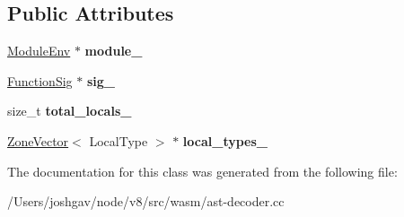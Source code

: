 \subsection*{Public Attributes}
\begin{DoxyCompactItemize}
\item 
\hyperlink{structv8_1_1internal_1_1wasm_1_1_module_env}{Module\+Env} $\ast$ {\bfseries module\+\_\+}\hypertarget{classv8_1_1internal_1_1wasm_1_1_wasm_decoder_a0fce7bb021d43a0669d9e4fc67094460}{}\label{classv8_1_1internal_1_1wasm_1_1_wasm_decoder_a0fce7bb021d43a0669d9e4fc67094460}

\item 
\hyperlink{classv8_1_1internal_1_1_signature}{Function\+Sig} $\ast$ {\bfseries sig\+\_\+}\hypertarget{classv8_1_1internal_1_1wasm_1_1_wasm_decoder_ac877468cbbd082abcd3188d4ff74d07f}{}\label{classv8_1_1internal_1_1wasm_1_1_wasm_decoder_ac877468cbbd082abcd3188d4ff74d07f}

\item 
size\+\_\+t {\bfseries total\+\_\+locals\+\_\+}\hypertarget{classv8_1_1internal_1_1wasm_1_1_wasm_decoder_ad1fe4be931e394cb3b3523989009e7aa}{}\label{classv8_1_1internal_1_1wasm_1_1_wasm_decoder_ad1fe4be931e394cb3b3523989009e7aa}

\item 
\hyperlink{classv8_1_1internal_1_1_zone_vector}{Zone\+Vector}$<$ Local\+Type $>$ $\ast$ {\bfseries local\+\_\+types\+\_\+}\hypertarget{classv8_1_1internal_1_1wasm_1_1_wasm_decoder_a1255aa3faeb0a0d172d541c230471c60}{}\label{classv8_1_1internal_1_1wasm_1_1_wasm_decoder_a1255aa3faeb0a0d172d541c230471c60}

\end{DoxyCompactItemize}


The documentation for this class was generated from the following file\+:\begin{DoxyCompactItemize}
\item 
/\+Users/joshgav/node/v8/src/wasm/ast-\/decoder.\+cc\end{DoxyCompactItemize}
